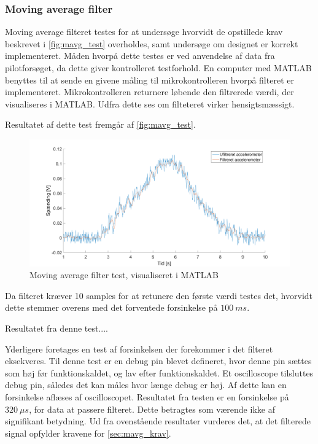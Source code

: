 \subsubsection{Moving average filter}
Moving average filteret testes for at undersøge hvorvidt de opstillede krav beskrevet i \autoref{fig:mavg_test} overholdes, samt undersøge om designet er korrekt implementeret. Måden hvorpå dette testes er ved anvendelse af data fra pilotforsøget, da dette giver kontrolleret testforhold. 
En computer med MATLAB benyttes til at sende en givene måling til mikrokontrolleren hvorpå filteret er implementeret. Mikrokontrolleren returnere løbende den filtrerede værdi, der visualiseres i MATLAB. Udfra dette ses om filteteret virker hensigtsmæssigt. 

Resultatet af dette test fremgår af \autoref{fig:mavg_test}. 

\begin{figure}[H]
	\centering
	\includegraphics[width=1\textwidth]{figures/accelerometer_filter}
	\caption{Moving average filter test, visualiseret i MATLAB}
	\label{fig:mavg_test}
\end{figure}

\noindent
Da filteret kræver 10 samples for at retunere den første værdi testes det, hvorvidt dette stemmer overens med det forventede forsinkelse på $100~ms$. 

Resultatet fra denne test.... %

Yderligere foretages en test af forsinkelsen der forekommer i det filteret eksekveres. Til denne test er en debug pin blevet defineret, hvor denne pin sættes som høj før funktionskaldet, og lav efter funktionskaldet. Et oscilloscope tilsluttes debug pin, således det kan måles hvor længe debug er høj. Af dette kan en forsinkelse aflæses af oscilloscopet. 
Resultatet fra testen er en forsinkelse på $320~\mu s$, for data at passere filteret. Dette betragtes som værende ikke af signifikant betydning.    
Ud fra ovenstående resultater vurderes det, at det filterede signal opfylder kravene for \autoref{sec:mavg_krav}. 